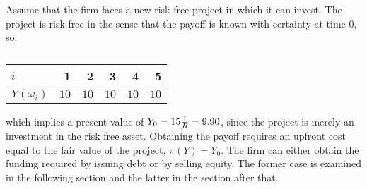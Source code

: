 \documentclass[main.tex]{subfiles}
\begin{document}
    Assume that the firm faces a new risk free project in which it can invest.
    The project is risk free in the sense that the payoff is known with certainty at time 0, so:
        \begin{table}[H]
            \centering
            \begin{tabular}{l|rrrrr}
                $i$ & 1 & 2 & 3 & 4 & 5 \\
                \hline
                $Y(\omega_{i})$ & $10$ & $10$ & $10$ & $10$ & $10$
            \end{tabular}
            \caption{}
        \end{table}
    which implies a present value of $Y_{0} = 15\frac{1}{R} = 9.90$, 
    since the project is merely an investment in the risk free asset.
    Obtaining the payoff requires an upfront cost equal to the fair value of the project, $\pi(Y) = Y_{0}$.
    The firm can either obtain the funding required by issuing debt or by selling equity.
    The former case is examined in the following section and the latter in the section after that.
\end{document}

